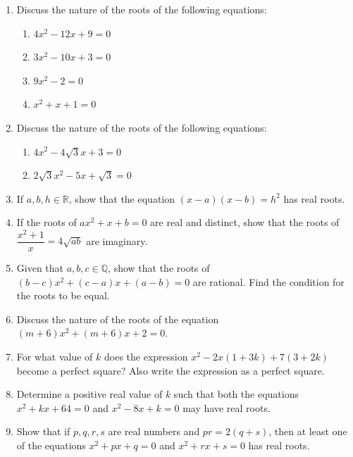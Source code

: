 \documentclass[12pt,a4paper]{article}
\begin{document}
\begin{enumerate}[label=Example \arabic*.]
    \item Discuss the nature of the roots of the following equations:
    \begin{enumerate}[label=(\roman*)]
        \item \( 4x^2 - 12x + 9 = 0 \)
        \item \( 3x^2 - 10x + 3 = 0 \)
        \item \( 9x^2 - 2 = 0 \)
        \item \( x^2 + x + 1 = 0 \)
    \end{enumerate}

    \item Discuss the nature of the roots of the following equations:
    \begin{enumerate}[label=(\roman*)]
        \item \( 4x^2 - 4\sqrt{3}x + 3 = 0 \)
        \item \( 2\sqrt{3}x^2 - 5x + \sqrt{3} = 0 \)
    \end{enumerate}

    \item If \( a, b, h \in \mathbb{R} \), show that the equation \( (x - a)(x - b) = h^2 \) has real roots.

    \item If the roots of \( ax^2 + x + b = 0 \) are real and distinct, show that the roots of \( \dfrac{x^2 + 1}{x} = 4\sqrt{ab} \) are imaginary.

    \item Given that \( a, b, c \in \mathbb{Q} \), show that the roots of \( (b - c)x^2 + (c - a)x + (a - b) = 0 \) are rational. Find the condition for the roots to be equal.

    \item Discuss the nature of the roots of the equation \( (m + 6)x^2 + (m + 6)x + 2 = 0 \).

    \item For what value of \( k \) does the expression \( x^2 - 2x(1 + 3k) + 7(3 + 2k) \) become a perfect square? Also write the expression as a perfect square.

    \item Determine a positive real value of \( k \) such that both the equations \( x^2 + kx + 64 = 0 \) and \( x^2 - 8x + k = 0 \) may have real roots.

    \item Show that if \( p, q, r, s \) are real numbers and \( pr = 2(q + s) \), then at least one of the equations \( x^2 + px + q = 0 \) and \( x^2 + rx + s = 0 \) has real roots.
\end{enumerate}
\end{document}
